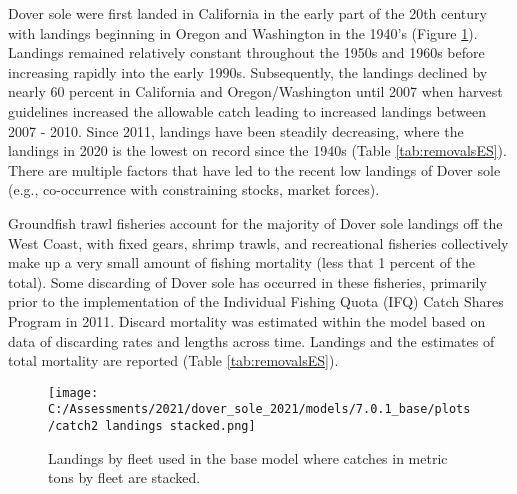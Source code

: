 \documentclass[11pt,
  english,
  a4paper,
]{article}
\begin{document}
\leavevmode\tagmcend\tagstructend


Dover sole were first landed in California in the early part of the 20th century with landings beginning in Oregon and Washington in the 1940's (Figure \ref{fig:es-catch}). Landings remained relatively constant throughout the 1950s and 1960s before increasing rapidly into the early 1990s. Subsequently, the landings declined by nearly 60 percent in California and Oregon/Washington until 2007 when harvest guidelines increased the allowable catch leading to increased landings between 2007 - 2010. Since 2011, landings have been steadily decreasing, where the landings in 2020 is the lowest on record since the 1940s (Table \ref{tab:removalsES}). There are multiple factors that have led to the recent low landings of Dover sole (e.g., co-occurrence with constraining stocks, market forces).

\leavevmode\tagmcend\tagstructend\par


Groundfish trawl fisheries account for the majority of Dover sole landings off the West Coast, with fixed gears, shrimp trawls, and recreational fisheries collectively make up a very small amount of fishing mortality (less that 1 percent of the total). Some discarding of Dover sole has occurred in these fisheries, primarily prior to the implementation of the Individual Fishing Quota (IFQ) Catch Shares Program in 2011. Discard mortality was estimated within the model based on data of discarding rates and lengths across time. Landings and the estimates of total mortality are reported (Table \ref{tab:removalsES}).

\leavevmode\tagmcend\tagstructend\par

\clearpage




\begin{figure}
\centering
\texttt{[image: C:/Assessments/2021/dover\_sole\_2021/models/7.0.1\_base/plots/catch2 landings stacked.png]}
\caption{Landings by fleet used in the base model where catches in metric tons by fleet are stacked.\label{fig:es-catch}}
\end{figure}
\end{document}
